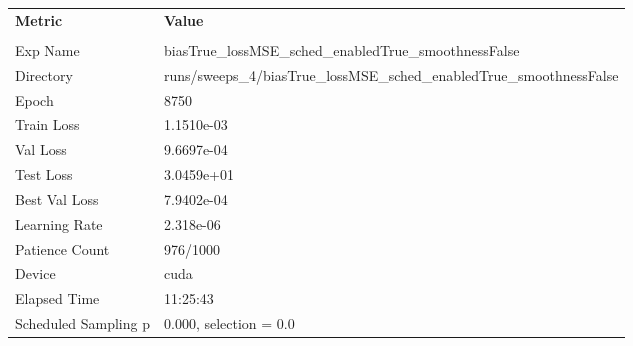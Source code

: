 \begin{tabular}{|l|l|}
\hline
\textbf{Metric} & \textbf{Value} \\\\
Exp Name & biasTrue_lossMSE_sched_enabledTrue_smoothnessFalse \\ 
Directory & runs/sweeps_4/biasTrue_lossMSE_sched_enabledTrue_smoothnessFalse \\ 
Epoch & 8750 \\ 
Train Loss & 1.1510e-03 \\ 
Val Loss & 9.6697e-04 \\ 
Test Loss & 3.0459e+01 \\ 
Best Val Loss & 7.9402e-04 \\ 
Learning Rate & 2.318e-06 \\ 
Patience Count & 976/1000 \\ 
Device & cuda \\ 
Elapsed Time & 11:25:43 \\ 
Scheduled Sampling p & 0.000, selection = 0.0 \\ 
\hline
\end{tabular}